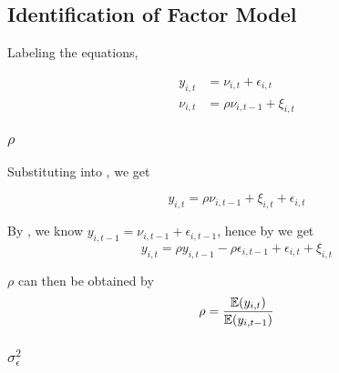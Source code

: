 \subsection{Identification of Factor Model}

Labeling the equations,

\begin{subequations}
    \begin{align}
        y_{i,t} &= \nu_{i,t} + \epsilon_{i,t} \label{eq:y-it} \\
        \nu_{i,t} &= \rho \nu_{i,t-1} + \xi_{i,t} \label{eq:nu-it}
    \end{align}
\end{subequations}

\subsubsection{$\rho$}

Substituting  into , we get 

\begin{equation}
    y_{i,t} = \rho \nu_{i,t-1} + \xi_{i,t}  + \epsilon_{i,t} \label{eq:y_t-1_nu}
\end{equation}

By , we know $y_{i,t-1} = \nu_{i,t-1} + \epsilon_{i,t-1}$, hence by  we get 
\begin{equation}
    y_{i,t} = \rho y_{i,t-1} - \rho \epsilon_{i,t-1} + \epsilon_{i,t} + \xi_{i,t}
\end{equation}

$\rho$ can then be obtained by
$$
    \rho = \frac{\operatorname{\mathbb{E}}(y_{i,t})}{\operatorname{\mathbb{E}}(y_{i,t-1})}
$$

\subsubsection{$\sigma_\epsilon^2$}